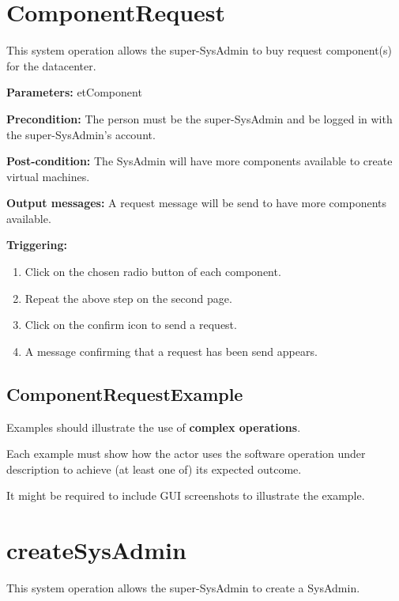 \section{ComponentRequest}
\label{operation:componentrequest}
This system operation allows the super-SysAdmin to buy request component(s) for
the datacenter.

\begin{description}

\item \textbf{Parameters:} etComponent
\item \textbf{Precondition:} The person must be the super-SysAdmin and be logged
in with the super-SysAdmin's account.
\item \textbf{Post-condition:} The SysAdmin will have more components
available to create virtual machines.
\item \textbf{Output messages:} A request message will be send to have more
components available.

\item \textbf{Triggering:}
\begin{enumerate}
\item Click on the chosen radio button of each component.
\item Repeat the above step on the second page.
\item Click on the confirm icon to send a request.
\item A message confirming that a request has been send appears.
\end{enumerate}

 
\end{description}

\subsection{ComponentRequestExample}
Examples should illustrate the use of \textbf{complex operations}.

Each example must show how the actor uses the software operation under
description to achieve (at least one of) its expected outcome.

It might be required to include GUI screenshots to illustrate the example.




\section{createSysAdmin}
\label{operation:createSysAdmin}
This system operation allows the super-SysAdmin to create a SysAdmin.

